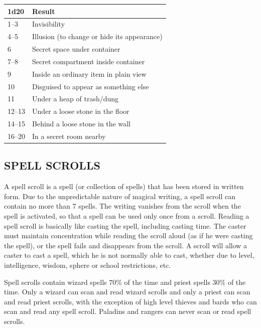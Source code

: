 \begin{multicols}{2}
\begin{minipage}{\columnwidth}
\label{treasurehiding}
\noindent
\begin{tabular}{|p{}|p{}|}
\hline
1d20	& Result \\
\hline\hline
\rowcolor[gray]{.9}1--3	& Invisibility \\
4--5	& Illusion (to change or hide its appearance) \\
\rowcolor[gray]{.9}6	& Secret space under container \\
7--8	& Secret compartment inside container \\
\rowcolor[gray]{.9}9	& Inside an ordinary item in plain view \\
10	& Disguised to appear as something else \\
\rowcolor[gray]{.9}11	& Under a heap of trash/dung \\
12--13	& Under a loose stone in the floor \\
\rowcolor[gray]{.9}14--15	& Behind a loose stone in the wall \\
16--20	& In a secret room nearby \\
\hline
\end{tabular}

\end{minipage}

\subsection{SPELL SCROLLS}

A spell scroll is a spell (or collection of spells) that has been stored in written form.  Due to the unpredictable nature of magical writing, a spell scroll can contain no more than 7 spells.  The writing vanishes from the scroll when the spell is activated, so that a spell can be used only once from a scroll.  Reading a spell scroll is basically like casting the spell, including casting time.  The caster must maintain concentration while reading the scroll aloud (as if he were casting the spell), or the spell fails and disappears from the scroll.  A scroll will allow a caster to cast a spell, which he is not normally able to cast, whether due to level, intelligence, wisdom, sphere or school restrictions, etc. 

Spell scrolls contain wizard spells 70\% of the time and priest spells 30\% of the time.  Only a wizard can scan and read wizard scrolls and only a priest can scan and read priest scrolls, with the exception of high level thieves and bards who can scan and read any spell scroll.  Paladins and rangers can never scan or read spell scrolls.


\end{multicols}
